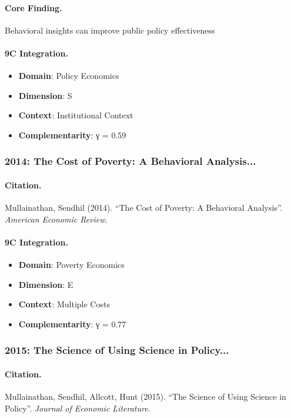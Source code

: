 \paragraph{Core Finding.}
Behavioral insights can improve public policy effectiveness

\paragraph{9C Integration.}
\begin{itemize}[nosep]
  \item \textbf{Domain}: Policy Economics
  \item \textbf{Dimension}: S
  \item \textbf{Context}: Institutional Context
  \item \textbf{Complementarity}: γ = 0.59
\end{itemize}


\subsubsection{2014: The Cost of Poverty: A Behavioral Analysis...}

\paragraph{Citation.}
Mullainathan, Sendhil (2014). ``The Cost of Poverty: A Behavioral Analysis''. \textit{American Economic Review}.

\paragraph{9C Integration.}
\begin{itemize}[nosep]
  \item \textbf{Domain}: Poverty Economics
  \item \textbf{Dimension}: E
  \item \textbf{Context}: Multiple Costs
  \item \textbf{Complementarity}: γ = 0.77
\end{itemize}


\subsubsection{2015: The Science of Using Science in Policy...}

\paragraph{Citation.}
Mullainathan, Sendhil, Allcott, Hunt (2015). ``The Science of Using Science in Policy''. \textit{Journal of Economic Literature}.

